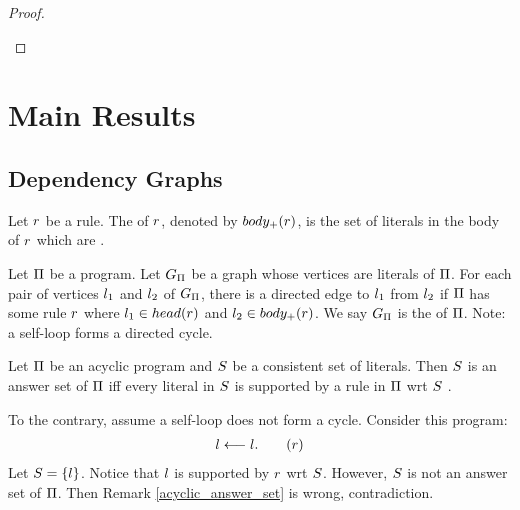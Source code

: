 \documentclass{paper}
\begin{document}
\begin{flushleft}
\begin{proof}
\begin{enumerate}
\end{enumerate}

\end{proof}


\section{Main Results}

\subsection{Dependency Graphs}

\begin{definition}

Let $r$ be a rule.
The  of $r$,
denoted by $body_+(r)$,
is the set of literals in the body of $r$ which are
\dnf.

\end{definition}

\begin{definition}

Let $\Pi$ be a \cp{} program.
Let $G_{\Pi}$ be a graph whose vertices are literals of $\Pi$.
For each pair of vertices ${l}_{1}$ and ${l}_{2}$ of
$G_{\Pi}$, there is a directed edge to ${l}_{1}$ from
${l}_{2}$ if $\Pi$ has some rule $r$ where
${l}_{1} \in head(r)$ and ${l}_{2} \in body_+(r)$.
We say $G_{\Pi}$ is the  of $\Pi$.
Note: a self-loop forms a directed cycle.

\end{definition}

\begin{remark}
\label{acyclic_answer_set}

Let $\Pi$ be an acyclic \ap{} program and $S$ be a
consistent set of literals.
Then $S$ is an answer set of $\Pi$ iff every literal in
$S$ is supported by a rule in $\Pi$ wrt $S$
\cite[page 58, Theorem 2.7]{hcfb}.

\end{remark}

\begin{example}

To the contrary, assume a self-loop does not form a cycle.
Consider this \ap{} program:
\begin{gather*}
\lit \when \lit. \tag{$\rl$}
\end{gather*}
Let $S = \{l\}$.
Notice that $l$ is supported by $r$ wrt $S$.
However, $S$ is not an answer set of $\Pi$.
Then Remark \ref{acyclic_answer_set} is wrong,
contradiction.


\end{example}
\end{flushleft}
\end{document}
